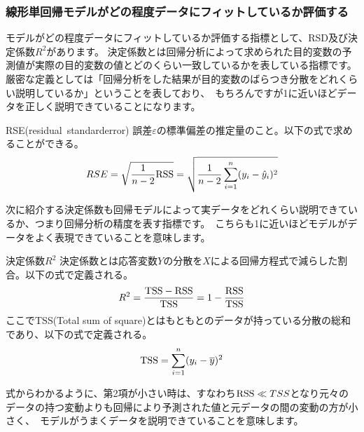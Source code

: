 \documentclass[uplatex]{jsarticle}
\begin{document}
\subsubsection{線形単回帰モデルがどの程度データにフィットしているか評価する}
モデルがどの程度データにフィットしているか評価する指標として、RSD及び決定係数$R^2$があります。
決定係数とは回帰分析によって求められた目的変数の予測値が実際の目的変数の値とどのくらい一致しているかを表している指標です。厳密な定義としては「回帰分析をした結果が目的変数のばらつき分散をどれくらい説明しているか」ということを表しており、\
もちろんですが1に近いほどデータを正しく説明できていることになります。
\begin{itembox}[l]{RSE(residual\ standarderror)}
  誤差$\varepsilon$の標準偏差の推定量のこと。以下の式で求めることができる。
  $$RSE = \sqrt{\frac{1}{n-2}{\rm RSS}} = \sqrt{\frac{1}{n-2}\sum_{i=1}^n(y_i - \hat{y}_i)^2}$$
\end{itembox}
次に紹介する決定係数も回帰モデルによって実データをどれくらい説明できているか、つまり回帰分析の精度を表す指標です。\
こちらも1に近いほどモデルがデータをよく表現できていることを意味します。
\begin{itembox}[l]{決定係数$R^2$}
  決定係数とは応答変数$Y$の分散を$X$による回帰方程式で減らした割合。以下の式で定義される。
  $$R^2 = \frac{{\rm TSS} - {\rm RSS}}{{\rm TSS}} = 1 - \frac{{\rm RSS}}{{\rm TSS}}$$
  ここでTSS(Total sum of square)とはもともとのデータが持っている分散の総和であり、以下の式で定義される。
  $${\rm TSS} = \sum_{i=1}^n (y_i - \overline{y})^2$$
\end{itembox}
式からわかるように、第2項が小さい時は、すなわち${\rm RSS} \ll TSS$となり元々のデータの持つ変動よりも回帰により予測された値と元データの間の変動の方が小さく、\
モデルがうまくデータを説明できていることを意味します。
\end{document}
